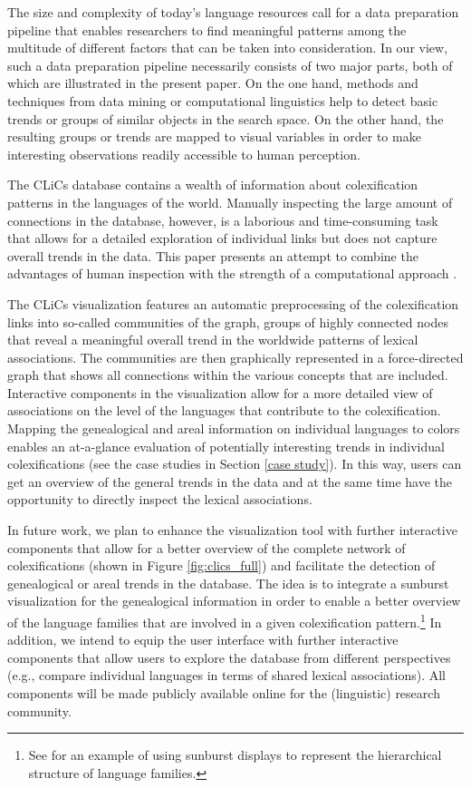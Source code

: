 \documentclass[10pt, a4paper]{article}
\begin{document}
The size and complexity of today's language resources call for a data preparation pipeline that enables researchers to find meaningful patterns among the multitude of different factors that can be taken into consideration. In our view, such a data preparation pipeline necessarily consists of two major parts, both of which are illustrated in the present paper. On the one hand, methods and techniques from data mining or computational linguistics help to detect basic trends or groups of similar objects in the search space. On the other hand, the resulting groups or trends are mapped to visual variables in order to make interesting observations readily accessible to human perception. 

The CLiCs database contains a wealth of information about colexification patterns in the languages of the world. Manually inspecting the large amount of connections in the database, however, is a laborious and time-consuming task that allows for a detailed exploration of individual links but does not capture overall trends in the data. This paper presents an attempt to combine the advantages of human inspection with the strength of a computational approach \cite{Keim2008}. 

The CLiCs visualization features an automatic preprocessing of the colexification links into so-called communities of the graph, groups of highly connected nodes that reveal a meaningful overall trend in the worldwide patterns of lexical associations. The communities are then graphically represented in a force-directed graph that shows all connections within the various concepts that are included. Interactive components in the visualization allow for a more detailed view of associations on the level of the languages that contribute to the colexification. 
Mapping the genealogical and areal information on individual languages to colors enables an at-a-glance evaluation of potentially interesting trends in individual colexifications (see the case studies in Section \ref{case study}). 
In this way, users can get an overview of the general trends in the data and at the same time have the opportunity to directly inspect the lexical associations. 

In future work, we plan to enhance the visualization tool with further interactive components that allow for a better overview of the complete network of colexifications (shown in Figure \ref{fig:clics_full}) and facilitate the detection of genealogical or areal trends in the database. The idea is to integrate a sunburst visualization \cite{Sunburst}  for the genealogical information in order to enable a better overview of the language families that are involved in a given colexification pattern.\footnote{See  for an example of using sunburst displays to represent the hierarchical structure of language families.} In addition, we intend to equip the user interface with further interactive components that allow users to explore the database from different perspectives (e.g., compare individual languages in terms of shared lexical associations). All components will be made publicly available online for the (linguistic) research community. 




\end{document}
